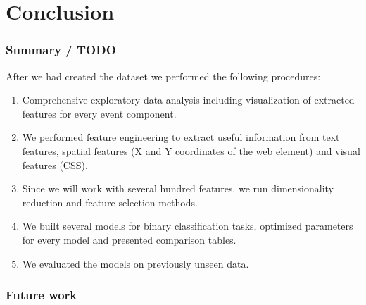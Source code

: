 \chapter{Conclusion}
\label{chap:conclusion}
\subsection{Summary / TODO}

After we had created the dataset we performed the following procedures:
\begin{enumerate}
    \item Comprehensive exploratory data analysis including visualization of extracted features for every event component.
    \item We performed feature engineering to extract useful information from text features, spatial features (X and Y coordinates of the web element) and visual features (CSS). 
    \item Since we will work with several hundred features, we run dimensionality reduction and feature selection methods. 
    \item We built several models for binary classification tasks, optimized parameters for every model and presented comparison tables.  
    \item We evaluated the models on previously unseen data.    
\end{enumerate}


\subsection{Future work}